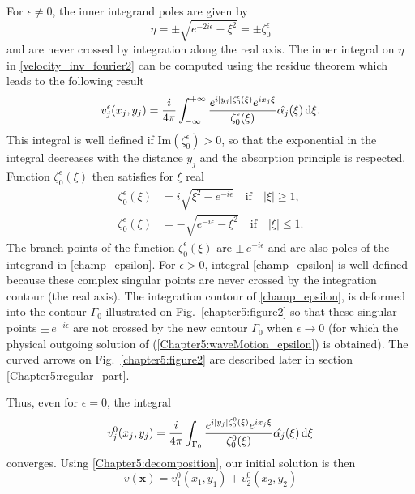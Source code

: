 For  $\epsilon \neq 0$, the inner integrand poles are given by
\begin{equation}
 \eta = \pm \sqrt{e^{-2i\epsilon} - \xi^2}  = \pm \zeta_0^\epsilon
\end{equation} 
and are never crossed by integration along the real axis. The inner integral on $\eta$ in \eqref{velocity_inv_fourier2} can be computed using the residue theorem which leads to the following result
\begin{equation}
\label{champ_epsilon}
v_j^\epsilon(x_j,y_j) = \dfrac{i}{4\pi} \int_{-\infty}^{+\infty}  \dfrac{e^{i|y_j|\zeta_0^\epsilon(\xi)} e^{i x_j \xi}}{\zeta_0^\epsilon(\xi)} \hat{\alpha_j}(\xi) \, {\rm d}\xi.
\end{equation}
This integral is well defined if $\text{Im}(\zeta_0^\epsilon) > 0$, so that the exponential in the integral decreases with the distance $y_j$ and the absorption principle is respected. Function $\zeta_0^\epsilon(\xi)$ then satisfies for $\xi$ real
\begin{subequations}
\label{zeta_function}
\begin{align}
\zeta_0^\epsilon(\xi)&= i\sqrt{\xi^2-e^{-i\epsilon}} \quad \text{if} \quad \vert \xi\vert \geq 1,\\
\label{zeta_function_inferior1}
\zeta_0^\epsilon(\xi)&= -\sqrt{e^{-i\epsilon}-\xi^2} \quad  \text{if} \quad \vert \xi\vert \leq 1.
\end{align}
\end{subequations}
The branch points of the function $\zeta_0^\epsilon(\xi)$ are $\pm  \, e^{-i\epsilon}$ and are also poles of the integrand in \eqref{champ_epsilon}. For $\epsilon > 0$, integral \eqref{champ_epsilon} is well defined because these complex singular points are never crossed by the integration contour (the real axis). The integration contour of \eqref{champ_epsilon}, is deformed into the contour $\Gamma_0$ illustrated on Fig.~\ref{chapter5:figure2} so that these singular points $\pm  \, e^{-i\epsilon}$ are not crossed by the new contour $\Gamma_0$  when $\epsilon \rightarrow 0$ (for which the physical outgoing solution of (\ref{Chapter5:waveMotion_epsilon}) is obtained). The curved arrows on Fig.~\ref{chapter5:figure2} are described later in section \ref{Chapter5:regular_part}.

Thus, even for $\epsilon=0$, the integral
\begin{equation}
\label{champ}
v_j^0(x_j,y_j) = \dfrac{i}{4\pi} \int_{\Gamma_0}  \dfrac{e^{i|y_j|\zeta_0^0(\xi)} e^{i x_j \xi}}{\zeta_0^0(\xi)} \hat{\alpha_j}(\xi)  \, {\rm d}\xi
\end{equation}
converges.
Using \eqref{Chapter5:decomposition}, our initial solution is then
\begin{equation}
\label{initial_sol}
v(\mathbf{x}) = v_1^0(x_1,y_1) + v_2^0(x_2,y_2)
\end{equation}

